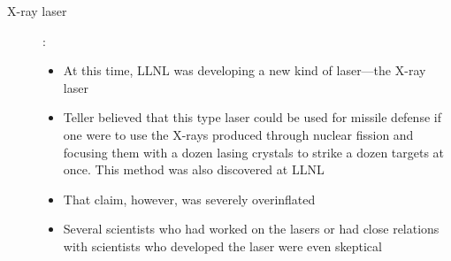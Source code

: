 \documentclass[12pt]{article}
\begin{document}
\begin{description}
\begin{description}
        

      \item[X-ray laser]:
        \begin{itemize}

          \item At this time, LLNL was developing a new kind of laser---the
            X-ray laser

          \item Teller believed that this type laser could be used for missile
            defense if one were to use the X-rays produced through nuclear
            fission and focusing them with a dozen lasing crystals to strike a
            dozen targets at once. This method was also discovered at LLNL

          \item That claim, however, was severely overinflated

          \item Several scientists who had worked on the lasers or had close
            relations with scientists who developed the laser were even
            skeptical


\end{itemize}
\end{description}
\end{description}
\end{document}
